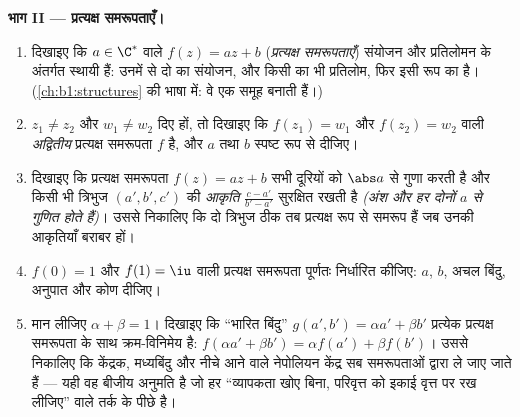 \begin{problem}
\medskip \noindent\textbf{भाग II --- प्रत्यक्ष समरूपताएँ।}
\begin{enumerate}[resume]
  \item दिखाइए कि $a \in \C^*$ वाले  $f(z) = az + b$
  (\emph{प्रत्यक्ष समरूपताएँ}) संयोजन और प्रतिलोमन के अंतर्गत स्थायी हैं:
  उनमें से दो का संयोजन, और किसी का भी प्रतिलोम, फिर इसी रूप का है।
  (\cref{ch:b1:structures} की भाषा में: वे एक समूह बनाती हैं।)
  \item $z_1 \neq z_2$ और $w_1 \neq w_2$ दिए हों, तो दिखाइए कि $f(z_1) =
  w_1$ और $f(z_2) = w_2$ वाली \emph{अद्वितीय} प्रत्यक्ष समरूपता $f$ है, और
  $a$ तथा $b$ स्पष्ट रूप से दीजिए।
  \item दिखाइए कि प्रत्यक्ष समरूपता $f(z) = az + b$ सभी दूरियों को $\abs a$
  से गुणा करती है और किसी भी त्रिभुज $(a', b', c')$ की \emph{आकृति} $\frac{c
  - a'}{b' - a'}$ सुरक्षित रखती है \emph{(अंश और हर दोनों $a$ से गुणित होते
  हैं)}। उससे निकालिए कि दो त्रिभुज ठीक तब प्रत्यक्ष रूप से समरूप हैं जब
  उनकी आकृतियाँ बराबर हों।
  \item $f(0) = 1$ और $f(1) = \iu$ वाली प्रत्यक्ष समरूपता पूर्णतः निर्धारित
  कीजिए: $a$, $b$, अचल बिंदु, अनुपात और कोण दीजिए।
  \item मान लीजिए $\alpha + \beta = 1$। दिखाइए कि ``भारित बिंदु'' $g(a', b')
  = \alpha a' + \beta b'$ प्रत्येक प्रत्यक्ष समरूपता के साथ क्रम-विनिमेय है:
  $f(\alpha a' + \beta b') = \alpha f(a') + \beta f(b')$। उससे निकालिए कि
  केंद्रक, मध्यबिंदु और नीचे आने वाले नेपोलियन केंद्र सब समरूपताओं द्वारा ले
  जाए जाते हैं --- यही वह बीजीय अनुमति है जो हर ``व्यापकता खोए बिना,
  परिवृत्त को इकाई वृत्त पर रख लीजिए'' वाले तर्क के पीछे है।
\end{enumerate}


\end{problem}
